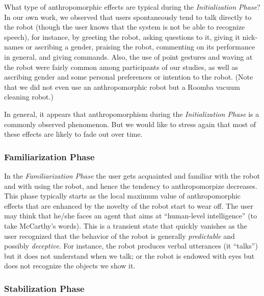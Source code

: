 \documentclass{frontiersSCNS} %
\begin{document}
What type of anthropomorphic effects are typical during the \textit{Initialization Phase}? In our own work, we observed that users spontaneously tend to talk directly to the robot (though the user knows that the system is not be able to recognize speech), for instance, by greeting the robot, asking questions to it, giving it nick-names or ascribing a gender, praising the robot, commenting on its performance in general, and giving commands. Also, the use of point gestures and waving at the robot were fairly common among participants of our studies, as well as ascribing gender and some personal preferences or intention to the robot. (Note that we did not even use an anthropomorphic robot but a Roomba vacuum cleaning robot.)

In general, it appears that anthropomorphism during the \textit{Initialization Phase} is a commonly observed phenomenon. But we would like to stress again that most of these effects are likely to fade out over time.

\subsubsection{Familiarization Phase\\}

In the \textit{Familiarization Phase} the user gets acquainted and familiar with the robot and with using the robot, and hence the tendency to anthropomorpize decreases. This phase typically starts as the local maximum value of anthropomorphic effects that are enhanced by the novelty of the robot start to wear off. The user may think that he/she faces an agent that aims at ``human-level intelligence'' (to take McCarthy's words). This is a transient state that quickly vanishes as the user recognized that the behavior of the robot is generally \textit{predictable} and possibly \textit{deceptive}. For instance, the robot produces verbal utterances (it ``talks'') but it does not understand when we talk; or the robot is endowed with eyes but does not recognize the objects we show it.

\subsubsection{Stabilization Phase\\}
\end{document}
